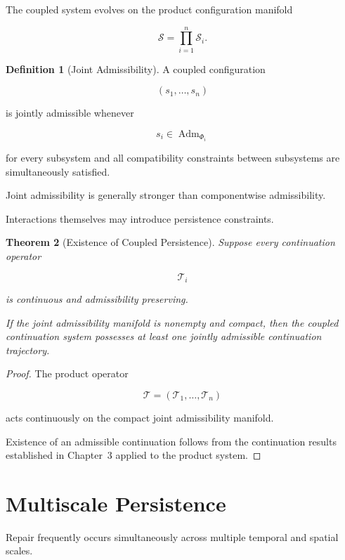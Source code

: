 \documentclass[11pt]{book}
\numberwithin{equation}{chapter}
\theoremstyle{definition}
\newtheorem{definition}{Definition}[chapter]
\theoremstyle{plain}
\newtheorem{theorem}[definition]{Theorem}
\begin{document}
The coupled system evolves on the product configuration manifold

\[
\mathcal S
=
\prod_{i=1}^{n}
\mathcal S_i.
\]

\begin{definition}[Joint Admissibility]

A coupled configuration

\[
(s_1,\ldots,s_n)
\]

is jointly admissible whenever

\[
s_i
\in
\operatorname{Adm}_{\Phi_i}
\]

for every subsystem and all compatibility constraints between
subsystems are simultaneously satisfied.

\end{definition}

Joint admissibility is generally stronger than componentwise
admissibility.

Interactions themselves may introduce persistence constraints.

\begin{theorem}[Existence of Coupled Persistence]

Suppose every continuation operator

\[
\mathcal T_i
\]

is continuous and admissibility preserving.

If the joint admissibility manifold is nonempty and compact, then the
coupled continuation system possesses at least one jointly admissible
continuation trajectory.

\end{theorem}

\begin{proof}

The product operator

\[
\mathcal T
=
(\mathcal T_1,\ldots,\mathcal T_n)
\]

acts continuously on the compact joint admissibility manifold.

Existence of an admissible continuation follows from the continuation
results established in Chapter~3 applied to the product system.

\end{proof}

\section{Multiscale Persistence}

Repair frequently occurs simultaneously across multiple temporal and
spatial scales.
\end{document}
